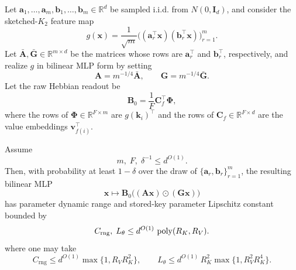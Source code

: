 \begin{proposition}
\label{prop:unwhitened_k2_norm_bounds}
Let \(\mathbf{a}_1,\dots,\mathbf{a}_m,\mathbf{b}_1,\dots,\mathbf{b}_m \in \mathbb{R}^d\) be sampled i.i.d. from \(N(0,\mathbf{I}_d)\), and consider the sketched-$K_{2}$ feature map
\[
g(\mathbf{x})=\frac{1}{\sqrt m}\bigl((\mathbf{a}_r^\top \mathbf{x})(\mathbf{b}_r^\top \mathbf{x})\bigr)_{r=1}^m.
\]
Let \(\bar{\mathbf{A}},\bar{\mathbf{G}}\in\mathbb{R}^{m\times d}\) be the matrices whose rows are \(\mathbf{a}_r^\top\) and \(\mathbf{b}_r^\top\), respectively, and realize \(g\) in bilinear MLP form by setting
\[
\mathbf{A}=m^{-1/4}\bar{\mathbf{A}},
\qquad
\mathbf{G}=m^{-1/4}\bar{\mathbf{G}}.
\]
Let the raw Hebbian readout be
\[
\mathbf{B}_0=\frac{1}{F}\mathbf{C}_f^\top \boldsymbol{\Phi},
\]
where the rows of \(\boldsymbol{\Phi}\in\mathbb{R}^{F\times m}\) are \(g(\mathbf{k}_i)^\top\)
and the rows of \(\mathbf{C}_f\in\mathbb{R}^{F\times d}\) are the value embeddings \(\mathbf{v}_{f(i)}^\top\).

Assume
\[
m,\;F,\;\delta^{-1}\le d^{O(1)}.
\]
Then, with probability at least \(1-\delta\) over the draw of
\(\{\mathbf{a}_r,\mathbf{b}_r\}_{r=1}^m\), the resulting bilinear MLP
\[
\mathbf{x}\mapsto \mathbf{B}_{0}\bigl((\mathbf{A}\mathbf{x})\odot(\mathbf{G}\mathbf{x})\bigr)
\]
has parameter dynamic range and stored-key parameter Lipschitz constant bounded by
\[
C_{\mathrm{rng}},\;L_\theta \le d^{O(1)}\,\operatorname{poly}(R_{K},R_{V}).
\]
where one may take
\[
C_{\mathrm{rng}} \le d^{O(1)}\max\{1,R_VR_{K}^2\},
\qquad
L_\theta \le d^{O(1)}\,R_{K}^2\max\{1,R_{V}^2R_{K}^4\}.
\]
\end{proposition}


